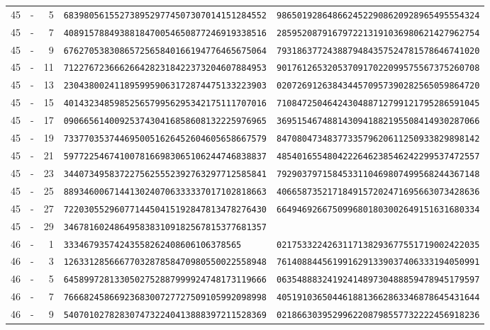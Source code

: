 \begin{longtable}{@{}rcrll@{}}
45&-&5&\texttt{6839805615527389529774507307014151284552}&\texttt{9865019286486624522908620928965495554324}\\
45&-&7&\texttt{4089157884938818470054650877246919338516}&\texttt{2859520879167972213191036980621427962754}\\
45&-&9&\texttt{6762705383086572565840166194776465675064}&\texttt{7931863772438879484357524781578646741020}\\
45&-&11&\texttt{7122767236662664282318422373204607884953}&\texttt{9017612653205370917022099575567375260708}\\
45&-&13&\texttt{2304380024118959959063172874475133223903}&\texttt{0207269126384344570957390282565059864720}\\
45&-&15&\texttt{4014323485985256579956295342175111707016}&\texttt{7108472504642430488712799121795286591045}\\
45&-&17&\texttt{0906656140092537430416858608132225976965}&\texttt{3695154674881430941882195508414930287066}\\
45&-&19&\texttt{7337703537446950051626452604605658667579}&\texttt{8470804734837733579620611250933829898142}\\
45&-&21&\texttt{5977225467410078166983065106244746838837}&\texttt{4854016554804222646238546242299537472557}\\
45&-&23&\texttt{3440734958372275625552392763297712585841}&\texttt{7929037971584533110469807499568244367148}\\
45&-&25&\texttt{8893460067144130240706333337017102818663}&\texttt{4066587352171849157202471695663073428636}\\
45&-&27&\texttt{7220305529607714450415192847813478276430}&\texttt{6649469266750996801803002649151631680334}\\
45&-&29&\texttt{3467816024864958383109182567815377681357}&\texttt{}\\
46&-&1&\texttt{33346793574243558262408606106378565}&\texttt{0217533224263117138293677551719002422035}\\
46&-&3&\texttt{1263312856667703287858470980550022558948}&\texttt{7614088445619916291339037406333194050991}\\
46&-&5&\texttt{6458997281330502752887999924748173119666}&\texttt{0635488832419241489730488859478945179597}\\
46&-&7&\texttt{7666824586692368300727727509105992098998}&\texttt{4051910365044618813662863346878645431644}\\
46&-&9&\texttt{5407010278283074732240413888397211528369}&\texttt{0218663039529962208798557732222456918236}\\

\end{longtable}
